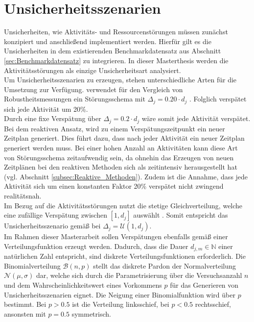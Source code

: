\section{Unsicherheitsszenarien} \label{sec:Unsicherheitsszenarien}

Unsicherheiten, wie Aktivitäts- und Ressourcenstörungen müssen zunächst konzipiert und anschließend implementiert werden. Hierfür gilt es die Unsicherheiten in dem existierenden Benchmarkdatensatz aus Abschnitt \ref{sec:Benchmarkdatensatz} zu integrieren. In dieser Masterthesis werden die Aktivitätsstörungen als einzige Unsicherheitsart analysiert. \\

Um Unsicherheitsszenarien zu erzeugen, stehen unterschiedliche Arten für die Umsetzung zur Verfügung. \cite{khemakhem_efficient_2013} verwendet für den Vergleich von Robustheitsmessungen ein Störungsschema mit $\Delta_j = 0.20 \cdot d_j$ \cite[vgl. ][S. 260]{khemakhem_efficient_2013}. Folglich verspätet sich jede Aktivität um 20\%. \\

Durch eine fixe Verspätung über $\Delta_j = 0.2 \cdot d_j$ wäre somit jede Aktivität verspätet. Bei dem reaktiven Ansatz, wird zu einem Verspätungszeitpunkt ein neuer Zeitplan generiert. Dies führt dazu, dass nach jeder Aktivität ein neuer Zeitplan generiert werden muss. Bei einer hohen Anzahl an Aktivitäten kann diese Art von Störungsschema zeitaufwendig sein, da ohnehin das Erzeugen von neuen Zeitplänen bei den reaktiven Methoden sich als zeitintensiv herausgestellt hat (vgl. Abschnitt \ref{subsec:Reaktive_Methoden}). Zudem ist die Annahme, dass jede Aktivität sich um einen konstanten Faktor 20\% verspätet nicht zwingend realitätsnah. \\

Im Bezug auf die Aktivitätsstörungen nutzt \cite{deblaere_reactive_2011} die stetige Gleichverteilung, welche eine zufällige Verspätung zwischen $[1, d_j]$ auswählt \cite[vgl.][S. 72]{deblaere_reactive_2011}. Somit entspricht das Unsicherheitsszenario gemäß \cite{deblaere_reactive_2011} bei $\Delta_j = \mathcal{U}(1, d_j)$. \\

Im Rahmen dieser Masterarbeit sollen Verspätungen ebenfalls gemäß einer Verteilungsfunktion erzeugt werden. Dadurch, dass die Dauer $d_{j,m} \in \mathbb{N}$ einer natürlichen Zahl entspricht, sind diskrete Verteilungsfunktionen erforderlich. Die Binomialverteilung $\mathcal{B}(n, p)$ stellt das diskrete Pardon der Normalverteilung $\mathcal{N}(\mu, \sigma)$ dar, welche sich durch die Parametrisierung über die Versuchsanzahl $n$ und dem Wahrscheinlichkeitswert eines Vorkommens $p$ für das Generieren von Unsicherheitsszenarien eignet. Die Neigung einer Binomialfunktion wird über $p$ bestimmt. Bei $p > 0.5$ ist die Verteilung linksschief, bei $p < 0.5$ rechtsschief, ansonsten mit $p = 0.5$ symmetrisch. \\

